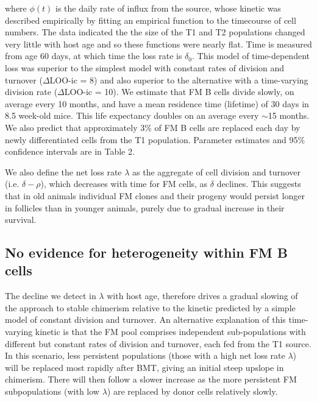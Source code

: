 \documentclass[11pt]{article}
\begin{document}
	where $\phi(t)$ is the daily rate of influx from the source, whose kinetic was described empirically by fitting an empirical function to the timecourse of cell numbers. The data indicated the the size of the T1 and T2 populations  changed very little with host age and so these functions were nearly flat. Time is measured from age 60 days, at which time the loss rate is $\delta_{0}$. This model of time-dependent loss was superior to the simplest model with constant rates of division and turnover ($\Delta$LOO-ic = 8) and also superior to the alternative with a time-varying division rate ($\Delta$LOO-ic = 10). We estimate that FM B cells divide slowly, on average every 10 months,  and have a mean residence time (lifetime) of 30 days in 8.5 week-old mice. This life expectancy doubles on an average every $\sim$15 months.
	We also predict that approximately 3\% of FM B cells are replaced each day by newly differentiated cells from the T1 population. Parameter estimates and 95\% confidence intervals are in Table 2.
	
	We also define the net loss rate $\lambda$ as the aggregate of cell division and turnover (i.e. $\delta - \rho$), which decreases with time for FM cells, as $\delta$ declines.
	This suggests that in old animals individual FM clones and their progeny would persist longer in follicles than in younger animals, purely due to gradual increase in their survival.
	
	\subsection*{No evidence for  heterogeneity within FM B cells}
	
	The decline we detect in $\lambda$ with host age, %
	therefore drives a gradual slowing of the approach to stable chimerism relative to the kinetic predicted by a simple model of constant division and turnover. An alternative explanation of this time-varying kinetic is that the FM pool comprises independent sub-populations with different but constant rates of division and turnover, each fed from the T1 source.  In this scenario, less persistent populations (those with a high net loss rate $\lambda$) will be replaced most rapidly after BMT, giving an initial steep upslope in chimerism. There will then follow a slower increase as the more persistent FM subpopulations (with low $\lambda$) are replaced by donor cells relatively slowly.
	
\end{document}
